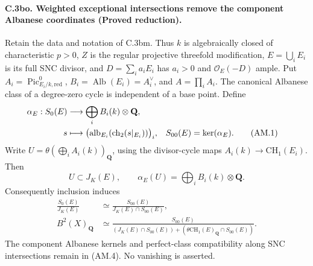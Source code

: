 \paragraph{C.3bo. Weighted exceptional intersections remove the component
Albanese coordinates (Proved reduction).}
Retain the data and notation of C.3bm. Thus $k$ is algebraically
closed of characteristic $p>0$, $Z$ is the regular projective
threefold modification, $E=\bigcup_iE_i$ is its full SNC divisor,
and $D=\sum_i a_iE_i$ has $a_i>0$ and $\mathcal O_E(-D)$ ample.
Put $A_i=\operatorname{Pic}^0_{E_i/k,\mathrm{red}}$,
$B_i=\operatorname{Alb}(E_i)=A_i^\vee$, and $A=\prod_iA_i$.
The canonical Albanese class of a degree-zero cycle is independent
of a base point. Define
\begin{align}
 \alpha_E:S_0(E)&\longrightarrow\bigoplus_iB_i(k)\otimes\mathbf Q,
 \notag\\
 s&\longmapsto
 \bigl(\operatorname{alb}_{E_i}(\operatorname{ch}_2(s|_{E_i}))\bigr)_i,
 &S_{00}(E)&=\ker(\alpha_E). \tag{AM.1}
\end{align}
Write
$U=\theta(\bigoplus_i A_i(k))_{\mathbf Q}$, using the divisor-cycle
maps $A_i(k)\to\mathrm{CH}_1(E_i)$. Then
\begin{equation}
 U\subset J_K(E),\qquad
 \alpha_E(U)=\bigoplus_iB_i(k)\otimes\mathbf Q. \tag{AM.2}
\end{equation}
Consequently inclusion induces
\begin{align}
 \frac{S_0(E)}{J_K(E)}
 &\simeq\frac{S_{00}(E)}{J_K(E)\cap S_{00}(E)}, \tag{AM.3}\\
 B^2(X)_{\mathbf Q}
 &\simeq
 \frac{S_{00}(E)}
 {(J_K(E)\cap S_{00}(E))+
  (\theta\mathrm{CH}_1(E)_{\mathbf Q}\cap S_{00}(E))}. \tag{AM.4}
\end{align}
The component Albanese kernels and perfect-class compatibility
along SNC intersections remain in (AM.4). No vanishing is asserted.

